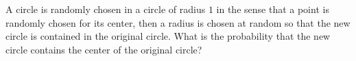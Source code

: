 A circle is randomly chosen in a circle of radius $1$ in the sense that a point is randomly chosen for its center, then a radius is chosen at random so that the new circle is contained in the original circle. What is the probability that the new circle contains the center of the original circle?